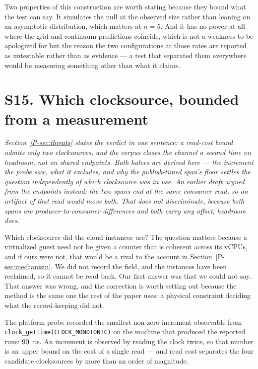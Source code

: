 \documentclass[10pt,journal,onecolumn]{IEEEtran}
\newcommand{\mainThreats}{\ref{P-sec:threats}}        %
\newcommand{\mainModeA}{\ref{P-sec:mechanism}}             %
\begin{document}
Two properties of this construction are worth stating because they bound what the test can
say. It simulates the null at the observed size rather than leaning on an asymptotic
distribution, which matters at $n = 5$. And it has
no power at all where the grid and continuum predictions coincide, which is not a weakness
to be apologized for but the reason the two configurations at those rates are reported as untestable
rather than as evidence --- a test that separated them everywhere would be measuring
something other than what it claims.


\section{S15. Which clocksource, bounded from a measurement}
\label{sec:clocksource}

\emph{Section~\mainThreats{} states the verdict in one sentence: a read-cost bound admits only
two clocksources, and the corpus closes the channel a second time on headroom, not on shared
endpoints. Both halves are derived here --- the increment the probe saw, what it excludes, and
why the publish-timed span's floor settles the question independently of which clocksource was
in use. An earlier draft argued from the endpoints instead: the two spans end at the same
consumer read, so an artifact of that read would move both. That does not discriminate, because
both spans are producer-to-consumer differences and both carry any offset; headroom does.}

Which clocksource did the cloud instances use? The question matters because a virtualized guest need
not be given a counter that is coherent across its vCPUs, and if ours were not, that would be
a rival to the account in Section~\mainModeA{}. We did not record the field, and the instances have been
reclaimed, so it cannot be read back. Our first answer was that we could not say. That answer
was wrong, and the correction is worth setting out because the method is the same one the
rest of the paper uses: a physical constraint deciding what the record-keeping did not.

The platform probe recorded the smallest non-zero increment observable from
\texttt{clock\_gettime(CLOCK\_MONOTONIC)} on the machine that produced the reported runs:
$90$~ns. An increment is observed by reading the clock twice, so that number
is an upper bound on the cost of a single read --- and read cost separates the four candidate
clocksources by more than an order of magnitude.
\end{document}

